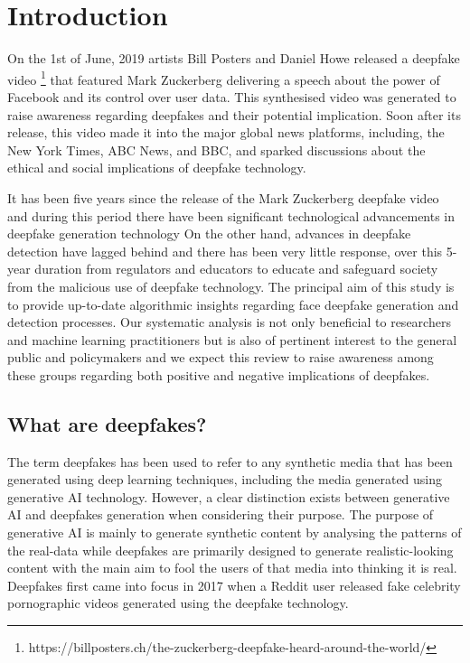 \section{Introduction}%
On the 1st of June, 2019 artists Bill Posters and Daniel Howe released a deepfake video \footnote{https://billposters.ch/the-zuckerberg-deepfake-heard-around-the-world/} that featured Mark Zuckerberg delivering a speech about the power of Facebook and its control over user data. This synthesised video was generated to raise awareness regarding deepfakes and their potential implication. Soon after its release, this video made it into the major global news platforms, including, the New York Times, ABC News, and BBC, and sparked discussions about the ethical and social implications of deepfake technology.



It has been five years since the release of the Mark Zuckerberg deepfake video and during this period there have been significant technological advancements in deepfake generation technology On the other hand,  advances in deepfake detection have lagged behind and there has been very little response, over this 5-year duration from regulators and educators to educate and safeguard society from the malicious use of deepfake technology. The principal aim of this study is to provide up-to-date algorithmic insights regarding face deepfake generation and detection processes.  Our systematic analysis is not only beneficial to researchers and machine learning practitioners but is also of pertinent interest to the general public and policymakers and we expect this review to raise awareness among these groups regarding both positive and negative implications of deepfakes.


\subsection{What are deepfakes?}
The term deepfakes has been used to refer to any synthetic media that has been generated using deep learning techniques, including the media generated using generative AI technology. However, a clear distinction exists between generative AI and deepfakes generation when considering their purpose. The purpose of generative AI is mainly to generate synthetic content by analysing the patterns of the real-data while deepfakes are primarily designed to generate realistic-looking content with the main aim to fool the users of that media into thinking it is real. Deepfakes first came into focus in 2017 when a Reddit user released fake celebrity pornographic videos generated using the deepfake technology.

